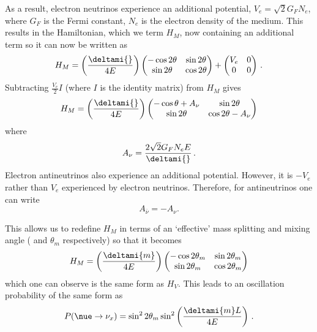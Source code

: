 As a result, electron neutrinos experience an additional potential, $V_{e} = \sqrt{2} G_{F} N_{e}$, where $G_{F}$ is the Fermi constant, $N_{e}$ is the electron density of the medium.
This results in the Hamiltonian, which we term $H_{M}$, now containing an additional term so it can now be written as
\begin{equation}
  H_{M} =  \left( \frac{\deltami{}}{4E} \right)
  \begin{pmatrix}
    -\cos 2\theta & \sin 2\theta \\
    \sin 2\theta & \cos 2\theta
  \end{pmatrix}
  +
  \begin{pmatrix}
    V_{e} & 0 \\
    0 & 0
  \end{pmatrix} \, .
\end{equation}
Subtracting $\frac{V_{e}}{2} I$ (where $I$ is the identity matrix) from $H_{M}$ gives
\begin{equation}
  H_{M} = \left( \frac{\deltami{}}{4E} \right)
  \begin{pmatrix}
    -\cos\theta + A_{\nu} & \sin 2\theta \\
    \sin 2\theta & \cos 2\theta - A_{\nu} 
  \end{pmatrix}
\end{equation}
where
\begin{equation}
  A_{\nu} = \frac{ 2\sqrt{2}G_{F}N_{e}E }{\deltami{}} \, .
\end{equation}
Electron antineutrinos also experience an additional potential. 
However, it is $-V_{e}$ rather than $V_{e}$ experienced by electron neutrinos.
Therefore, for antineutrinos one can write
\begin{equation}
	A_{\overline{\nu}} = -A_{\nu} .
\end{equation}

This allows us to redefine $H_{M}$ in terms of an `effective' mass splitting and mixing angle ( and $\theta_{m}$ respectively) so that it becomes
\begin{equation}
  H_{M} = \left( \frac{\deltami{m}}{4E} \right)
  \begin{pmatrix}
    -\cos 2\theta_{m} & \sin 2\theta_{m} \\
    \sin 2\theta_{m} & \cos 2\theta_{m}
  \end{pmatrix}
\end{equation}
which one can observe is the same form as $H_{V}$.
This leads to an oscillation probability of the same form as 
\begin{equation}
  P(\nue \rightarrow \nu_{x}) = \sin^{2} 2\theta_{m} \sin^{2} \left( \frac{\deltami{m} L}{4E} \right) \, .
\end{equation}

